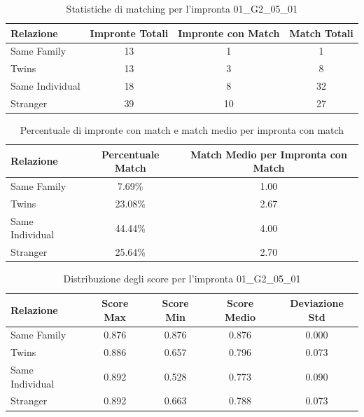 \begin{table}[htbp]
\centering
\caption{Statistiche di matching per l'impronta 01\_G2\_05\_01}
\label{tab:results_01_G2_05_01}
\begin{tabular}{|l|c|c|c|}
\hline
\textbf{Relazione} & \textbf{Impronte Totali} & \textbf{Impronte con Match} & \textbf{Match Totali} \\
\hline
Same Family & 13 & 1 & 1 \\
\hline
Twins & 13 & 3 & 8 \\
\hline
Same Individual & 18 & 8 & 32 \\
\hline
Stranger & 39 & 10 & 27 \\
\hline
\end{tabular}
\end{table}


\begin{table}[htbp]
\centering
\caption{Percentuale di impronte con match e match medio per impronta con match}
\label{tab:match_percentage_01_G2_05_01}
\begin{tabular}{|l|c|c|}
\hline
\textbf{Relazione} & \textbf{Percentuale Match} & \textbf{Match Medio per Impronta con Match} \\
\hline
Same Family & 7.69\% & 1.00 \\
\hline
Twins & 23.08\% & 2.67 \\
\hline
Same Individual & 44.44\% & 4.00 \\
\hline
Stranger & 25.64\% & 2.70 \\
\hline
\end{tabular}
\end{table}


\begin{table}[htbp]
\centering
\caption{Distribuzione degli score per l'impronta 01\_G2\_05\_01}
\label{tab:scores_01_G2_05_01}
\begin{tabular}{|l|c|c|c|c|}
\hline
\textbf{Relazione} & \textbf{Score Max} & \textbf{Score Min} & \textbf{Score Medio} & \textbf{Deviazione Std} \\
\hline
Same Family & 0.876 & 0.876 & 0.876 & 0.000 \\
\hline
Twins & 0.886 & 0.657 & 0.796 & 0.073 \\
\hline
Same Individual & 0.892 & 0.528 & 0.773 & 0.090 \\
\hline
Stranger & 0.892 & 0.663 & 0.788 & 0.073 \\
\hline
\end{tabular}
\end{table}

